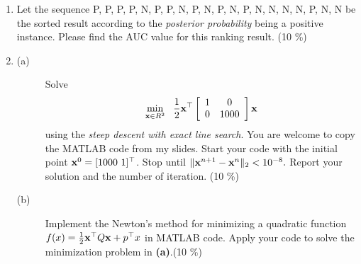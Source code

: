 \documentclass[12pt]{article}
\begin{document}
\begin{enumerate}
\item Let the sequence P, P, P, P, N, P, P, N, P, N, P, N, P, N, N, N, N,
P, N, N be the sorted result according to the {\em posterior
probability} being a positive instance. Please find the AUC value
for this ranking result. (10 \%)
\ \\
\item
\begin{description}
\item[(a)] Solve \[\min_{{\bf x}\in R^2}\ \  \frac{1}{2}{\bf x}^{\top}\left[\begin{array}{cc}
1&0\\
0&1000
\end{array}\right] {\bf x}\] using the {\em steep descent with exact line
 search}. You are welcome to copy the MATLAB code from my slides.
 Start your code with the initial point ${\bf x}^0=[1000 \  1]^ {\top}$. Stop
 until $\|{\bf x}^{n+1} -{\bf x}^{n}\|_2 < 10^{-8}.$ Report your solution and
 the number of iteration. (10 \%) \ \\
\item[(b)] Implement the Newton's method for minimizing a quadratic
 function $f(x)=\frac{1}{2} {\bf x}^{\top}Q {\bf x}+p^{\top}x$ in MATLAB code. Apply your
 code to solve the minimization problem in {\bf (a)}.(10 \%)
\end{description}
\newpage


\end{enumerate}
\end{document}
